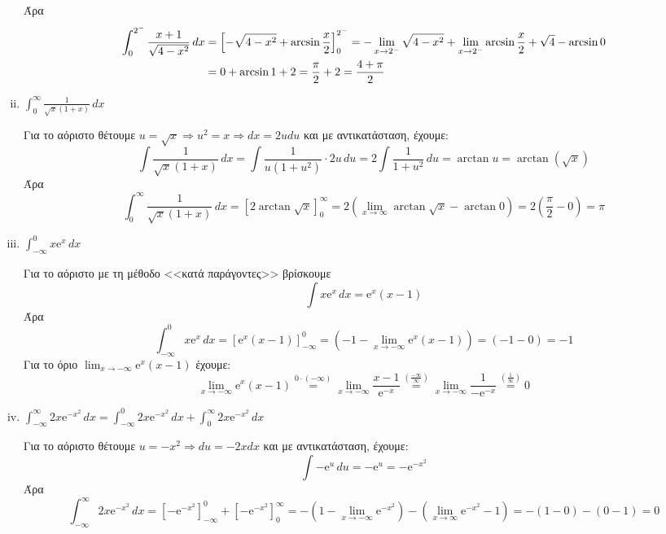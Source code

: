 \begin{enumerate}[i)]
\begin{solution}
  Άρα 
  \begin{align*}
    \int _{0}^{2^-} \frac{x+1}{\sqrt{4-x^{2}}}  \,{dx} 
    &= \Bigl[- \sqrt{4-x^{2}} +
     \arcsin{\frac{x}{2}} \Bigr]_{0}^{2^-} = - \lim_{x \to 2^-} \sqrt{4-x^2} +
     \lim_{x \to 2^-} \arcsin{\frac{x}{2}} + \sqrt{4} - \arcsin{0} \\
    &= 0 + \arcsin{1} + 2 = \frac{\pi}{2} + 2 = \frac{4 + \pi}{2}
     \end{align*}
  \end{solution}


  \item $ \boxed{\int_0^{\infty} \frac{1}{\sqrt{x} (1+x)} \,{dx}} $
    \begin{solution}
      Για το αόριστο θέτουμε $ u= \sqrt{x} \Rightarrow u^{2}=x \Rightarrow dx = 2udu $ 
      και με αντικατάσταση, έχουμε: 
      \[ 
        \int \frac{1}{\sqrt{x} (1+x)} \,{dx} = \int \frac{1}{u(1+u^{2})} \cdot 2u \,{du}
        = 2\int \frac{1}{1+u^{2}} \,{du} = \arctan{u} = \arctan{(\sqrt{x})}
      \]
      Άρα 
      \[ 
        \int _{0}^{\infty} \frac{1}{\sqrt{x} (1+x)} \,{dx} = \left[2
        \arctan{\sqrt{x}}\right]_{0}^{\infty} = 2( \lim_{x \to \infty}
        \arctan{\sqrt{x}} - \arctan{0}) = 2\left( \frac{\pi}{2} - 0\right) = \pi
      \]
    \end{solution}
  \item $ \boxed{\int _{- \infty}^{0} x \mathrm{e}^{x} \,{dx}} $
    \begin{solution}
      Για το αόριστο με τη μέθοδο <<κατά παράγοντες>> βρίσκουμε
      \[
        \int x \mathrm{e}^{x} \,{dx} = \mathrm{e}^{x} (x-1) 
      \]
      Άρα 
      \[
        \int _{-\infty}^{0} x \mathrm{e}^{x} \,{dx} =
        \left[\mathrm{e}^{x}(x-1)\right]_{-\infty}^{0} = (-1 - \lim_{x \to - \infty}
        \mathrm{e}^{x}(x-1)) = (-1 - 0) = -1 
      \]
Για το όριο $ \lim_{x \to - \infty} \mathrm{e}^{x} (x-1) $ έχουμε:
\[
  \lim_{x \to -\infty} \mathrm{e}^{x} (x-1) \overset{0 \cdot (-\infty)}{=}  
   \lim_{x \to - \infty} \frac{x-1}{\mathrm{e}^{-x}}
  \overset{(\frac{- \infty}{\infty})}{=} \lim_{x \to - \infty} \frac{1}{-
    \mathrm{e}^{-x}} \overset{(\frac{1}{\infty})}{=} 0   
\] 
    \end{solution}

  \item $ \boxed{\int _{- \infty }^{\infty } 2x \mathrm{e}^{-x^{2}} \,{dx}} = \int _{- \infty
    }^{0} 2x \mathrm{e}^{-x^{2}} \,{dx} + \int _{0}^{\infty} 2x \mathrm{e}^{-x^{2}} \,{dx} 
    $
    \begin{solution}
      Για το αόριστο θέτουμε $ u = - x^{2} \Rightarrow du = -2xdx $ και με αντικατάσταση, 
      έχουμε:
      \[
        \int - \mathrm{e}^{u} \,{du} = - \mathrm{e}^{u} = - \mathrm{e}^{-x^{2}}
      \] 
      Άρα 
      \[ 
        \int _{- \infty }^{\infty } 2x \mathrm{e}^{-x^{2}} \,{dx} = 
        [- \mathrm{e}^{-x^{2}} ]_{- \infty}^{0} + [- \mathrm{e}^{-x^{2}} ]_{0}^{\infty} 
      = - (1 - \lim_{x \to - \infty} \mathrm{e}^{-x^{2}} ) - ( \lim_{x \to \infty}
      \mathrm{e}^{-x^{2}} - 1) = - (1 - 0) - (0-1) = 0
      \]
    \end{solution}


\end{enumerate}
